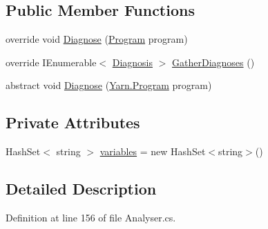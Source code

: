 \subsection*{Public Member Functions}
\begin{DoxyCompactItemize}
\item 
override void \hyperlink{a00191_a980f0e64bc5ad171c35ec19bdf838b5c}{Diagnose} (\hyperlink{a00154}{Program} program)
\item 
override I\-Enumerable$<$ \hyperlink{a00093}{Diagnosis} $>$ \hyperlink{a00191_ab84e7a8e68740379dee12a51dca69b07}{Gather\-Diagnoses} ()
\item 
abstract void \hyperlink{a00055_aba4a36cb823b11ee491074e26477d084}{Diagnose} (\hyperlink{a00154}{Yarn.\-Program} program)
\end{DoxyCompactItemize}
\subsection*{Private Attributes}
\begin{DoxyCompactItemize}
\item 
Hash\-Set$<$ string $>$ \hyperlink{a00191_a64ed6c3394c474b6cf5804a35f560746}{variables} = new Hash\-Set$<$string$>$()
\end{DoxyCompactItemize}


\subsection{Detailed Description}


Definition at line 156 of file Analyser.\-cs.



